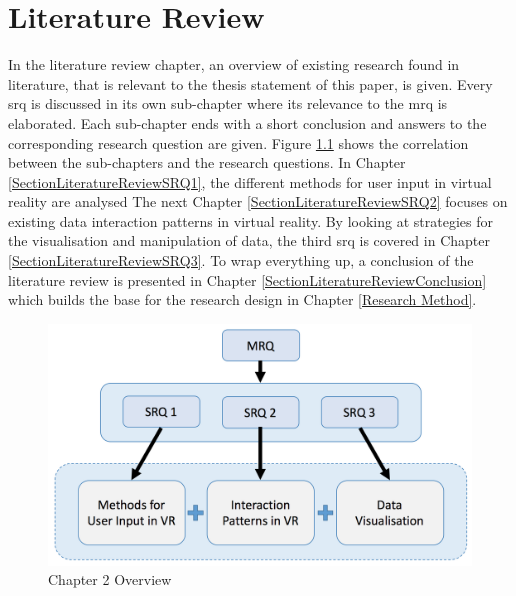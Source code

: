 
\chapter{Literature Review}

\label{ChapterLiteratureReview}

In the literature review chapter, an overview of existing research found in literature, that is relevant to the thesis statement of this paper, is given. Every \gls{srq} is discussed in its own sub-chapter where its relevance to the \gls{mrq} is elaborated. Each sub-chapter ends with a short conclusion and answers to the corresponding research question are given.
Figure \ref{fig:litreviewoverview} shows the correlation between the sub-chapters and the research questions. In Chapter \ref{SectionLiteratureReviewSRQ1}, the different methods for user input in virtual reality are analysed The next Chapter \ref{SectionLiteratureReviewSRQ2} focuses on existing data interaction patterns in virtual reality. By looking at strategies for the visualisation and manipulation of data, the third \gls{srq} is covered in Chapter \ref{SectionLiteratureReviewSRQ3}. To wrap everything up, a conclusion of the literature review is presented in Chapter \ref{SectionLiteratureReviewConclusion} which builds the base for the research design in Chapter \ref{Research Method}.
\newline
\begin{figure}[h]
	\begin{center}
		\includegraphics[width=12cm]{03_Figures/05_LitReview/LitReview_SRQ.png}
		\caption{Chapter 2 Overview}
		\label{fig:litreviewoverview}
	\end{center}
\end{figure}


